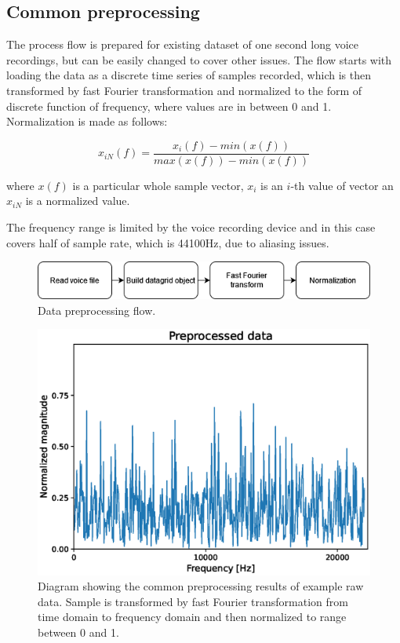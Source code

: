 \documentclass[energies,article,submit,pdftex,moreauthors]{Definitions/mdpi}
\begin{document}
\subsection{Common preprocessing}

The process flow is prepared for existing dataset of one second long voice recordings, but can be easily changed to cover other issues. The flow starts with loading the data as a discrete time series of samples recorded, which is then transformed by fast Fourier transformation and normalized to the form of discrete function of frequency, where values are in between 0 and 1. Normalization is made as follows:

\begin{linenomath}
\begin{equation}
x_{iN}(f) = \frac{x_i(f) - min(x(f))}{max(x(f)) - min(x(f))}
\end{equation}
\end{linenomath}
where $x(f)$ is a particular whole sample vector, $x_i$ is an $i$-th value of vector an $x_{iN}$ is a normalized value.

The frequency range is limited by the voice recording device and in this case covers half of sample rate, which is 44100Hz, due to aliasing issues.

\vspace{5mm}
\begin{figure}[H]
\includegraphics[width=\textwidth]{images/preprocessing_flow}
\caption{Data preprocessing flow.}
\end{figure}
\unskip
\vspace{5mm}

\begin{figure}[H]
\includegraphics[width=\textwidth]{images/common_preprocessing}
\caption{Diagram showing the common preprocessing results of example raw data. Sample is transformed by fast Fourier transformation from time domain to frequency domain and then normalized to range between 0 and 1.}
\end{figure}
\unskip
\vspace{5mm}
\end{document}
